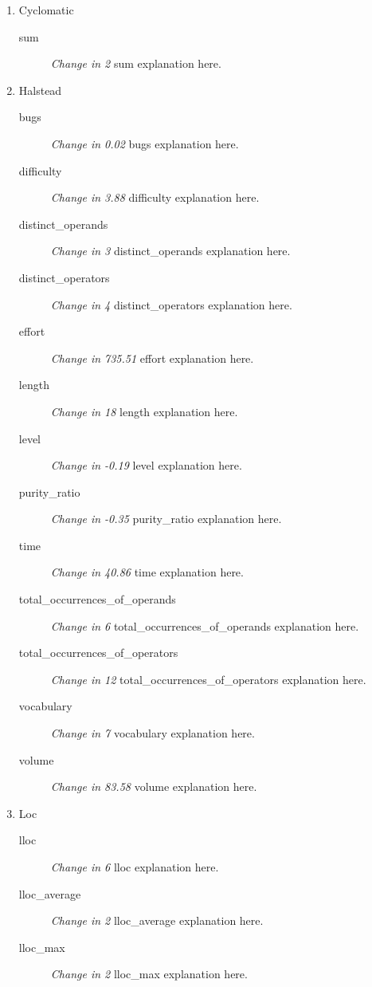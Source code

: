 \begin{enumerate}
  \item Cyclomatic
        \begin{description}
          \item [sum] \textit{Change in 2} sum explanation here.
        \end{description}
  \item Halstead
        \begin{description}
          \item [bugs] \textit{Change in 0.02} bugs explanation here.
          \item [difficulty] \textit{Change in 3.88} difficulty explanation here.
          \item [distinct\_operands] \textit{Change in 3} distinct\_operands explanation here.
          \item [distinct\_operators] \textit{Change in 4} distinct\_operators explanation here.
          \item [effort] \textit{Change in 735.51} effort explanation here.
          \item [length] \textit{Change in 18} length explanation here.
          \item [level] \textit{Change in -0.19} level explanation here.
          \item [purity\_ratio] \textit{Change in -0.35} purity\_ratio explanation here.
          \item [time] \textit{Change in 40.86} time explanation here.
          \item [total\_occurrences\_of\_operands] \textit{Change in 6} total\_occurrences\_of\_operands explanation here.
          \item [total\_occurrences\_of\_operators] \textit{Change in 12} total\_occurrences\_of\_operators explanation here.
          \item [vocabulary] \textit{Change in 7} vocabulary explanation here.
          \item [volume] \textit{Change in 83.58} volume explanation here.
        \end{description}
  \item Loc
        \begin{description}
          \item [lloc] \textit{Change in 6} lloc explanation here.
          \item [lloc\_average] \textit{Change in 2} lloc\_average explanation here.
          \item [lloc\_max] \textit{Change in 2} lloc\_max explanation here.

\end{description}
\end{enumerate}
